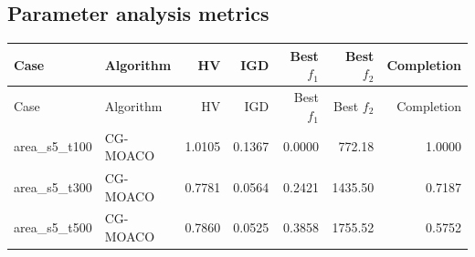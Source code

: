 \subsection*{Parameter analysis metrics}
\begin{longtable}{llrrrrr}
\toprule
Case & Algorithm & HV & IGD & Best $f_1$ & Best $f_2$ & Completion \\
\midrule
\endfirsthead
\toprule
Case & Algorithm & HV & IGD & Best $f_1$ & Best $f_2$ & Completion \\
\midrule
\endhead
area\_s5\_t100 & CG-MOACO & 1.0105 & 0.1367 & 0.0000 & 772.18 & 1.0000 \\
area\_s5\_t300 & CG-MOACO & 0.7781 & 0.0564 & 0.2421 & 1435.50 & 0.7187 \\
area\_s5\_t500 & CG-MOACO & 0.7860 & 0.0525 & 0.3858 & 1755.52 & 0.5752 \\
\bottomrule
\end{longtable}
